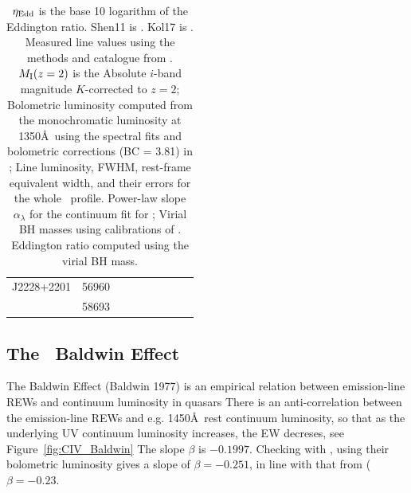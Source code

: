 \documentclass[a4paper,fleqn,usenatbib]{mnras}
\begin{document}
\begin{table}
\begin{tabular}{l l  ll ll cc r}
J2228+2201               & 56960                          &                                       &                                                &                              &                               &                 &                                        & \\
                                  & 58693                          &                                       &                                               &                               &                                &                &                   &  \\
    \hline
    \hline
  \end{tabular}
  \caption{$\eta_{\rm Edd}$ is the base 10 logarithm of the Eddington ratio.
        Shen11 is \citet{Shen2011}. 
        Kol17 is \citet{Kozlowski2017}.
        Measured line values using the methods and catalogue from
\citet{Shen2011}.  $M_{\rm I}(z=2)$ is the Absolute $i$-band magnitude
$K$-corrected to $z = 2$; Bolometric luminosity computed from the
monochromatic luminosity at 1350\AA\ using the spectral fits and
bolometric corrections (BC = 3.81) in \citet{Richards2006b}; Line
luminosity, FWHM, rest-frame equivalent width, and their errors for
the whole \civ\ profile.  Power-law slope $\alpha_{\lambda}$ for the
continuum fit for \civ; Virial BH masses using calibrations of
\citet{VestergaardPeterson2006}.  Eddington ratio computed using the
virial BH mass.}
\label{tab:Eddington_ratios} 
\end{table}

\subsection{The \civ\ Baldwin Effect}
The Baldwin Effect (Baldwin 1977) is an empirical %
relation between emission-line REWs and continuum luminosity in
quasars \citep[][]{Shields2007, Hamann2017, Calderone2017}
There is an anti-correlation between the emission-line REWs and e.g. 1450\AA\ rest continuum luminosity,
so that as the underlying UV continuum luminosity increases, the EW decreses,
see Figure~\ref{fig:CIV_Baldwin}
The slope $\beta$ is $-0.1997$. 
Checking with \citet{Kozlowski2017}, using their bolometric luminosity gives a slope of $\beta=-0.251$,
in line with that from \citet{Hamann2017} ($\beta=-0.23$.
\end{document}

